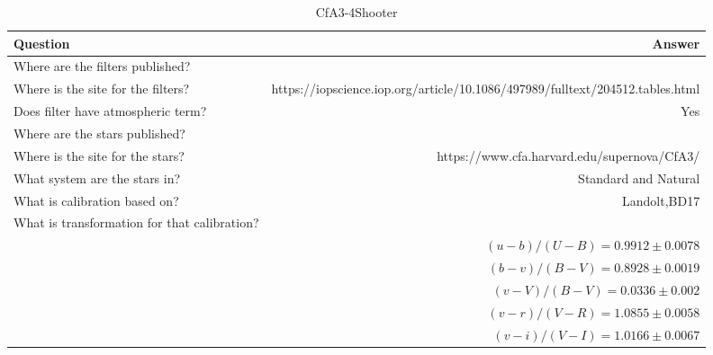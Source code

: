 \documentclass[twocolumn]{aastex63}
\begin{document}
\begin{table}
\caption{\large CfA3-4Shooter}
\label{table:information}
\begin{tabular}{lr}
\toprule
    Question & Answer \\
\hline

Where are the filters published? & \cite{CfA3-4Shooter} \\
Where is the site for the filters? & https://iopscience.iop.org/article/10.1086/497989/fulltext/204512.tables.html \\
Does filter have atmospheric term?	& Yes \\
Where are the stars published? & \cite{cfa34shooterstars} \\
Where is the site for the stars? & https://www.cfa.harvard.edu/supernova/CfA3/ \\
What system are the stars in? & Standard and Natural \\
What is calibration based on? & Landolt,BD17 \\
What is transformation for that calibration? & ~\\
~& $(u-b)/(U-B) = 0.9912 \pm 0.0078$ \\
~ & $(b-v)/(B-V) = 0.8928 \pm 0.0019$ \\
~ & $(v-V)/(B-V) = 0.0336 \pm 0.002$ \\
~ & $(v-r)/(V-R) = 1.0855 \pm 0.0058$ \\
~ & $(v-i)/(V-I) = 1.0166 \pm 0.0067$ \\
\end{tabular}
\end{table}
\end{document}
